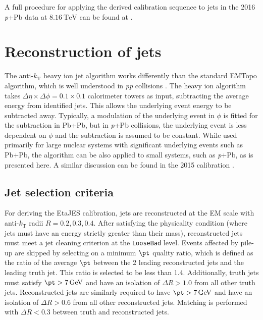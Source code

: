 \documentclass[NOTE, atlasdraft=true, texlive=2016, USenglish]{\ATLASLATEXPATH atlasdoc}
\begin{document}
A full procedure for applying the derived calibration sequence to jets in the 2016 \textit{p}+Pb data at $\SI{8.16}{\TeV}$ can be found at \cite{HIRun2JESdata2016}.

\section{Reconstruction of jets}
\label{sec:reconstruction}

The anti-$k_{\text{T}}$ heavy ion jet algorithm works differently than the standard EMTopo algorithm, which is well understood in \textit{pp} collisions \cite{Cacciari:2008gp}. The heavy ion algorithm takes $\Delta\eta\times\Delta\phi=0.1\times0.1$ calorimeter towers as input, subtracting the average energy from identified jets. This allows the underlying event energy to be subtracted away. Typically, a modulation of the underlying event in $\phi$ is fitted for the subtraction in Pb+Pb, but in \textit{p}+Pb collisions, the underlying event is less dependent on $\phi$ and the subtraction is assumed to be constant. While used primarily for large nuclear systems with significant underlying events such as Pb+Pb, the algorithm can be also applied to small systems, such as \textit{p}+Pb, as is presented here. A similar discussion can be found in the 2015 calibration \cite{ATL-COM-PHYS-2016-101}.\par
\subsection{Jet selection criteria}
For deriving the EtaJES calibration, jets are reconstructed at the EM scale with anti-$k_{\text{T}}$ radii $R=0.2, 0.3, 0.4$. After satisfying the physicality condition (where jets must have an energy strictly greater than their mass), reconstructed jets must meet a jet cleaning criterion at the \texttt{LooseBad} level. Events affected by pile-up are skipped by selecting on a minimum $\pt$ quality ratio, which is defined as the ratio of the average $\pt$ between the 2 leading reconstructed jets and the leading truth jet. This ratio is selected to be less than 1.4. Additionally, truth jets must satisfy $\pt > \SI{7}{\GeV}$ and have an isolation of $\Delta R > 1.0$ from all other truth jets. Reconstructed jets are similarly required to have $\pt > \SI{7}{\GeV}$ and have an isolation of $\Delta R > 0.6$ from all other reconstructed jets. Matching is performed with $\Delta R < 0.3$ between truth and reconstructed jets.
\end{document}
